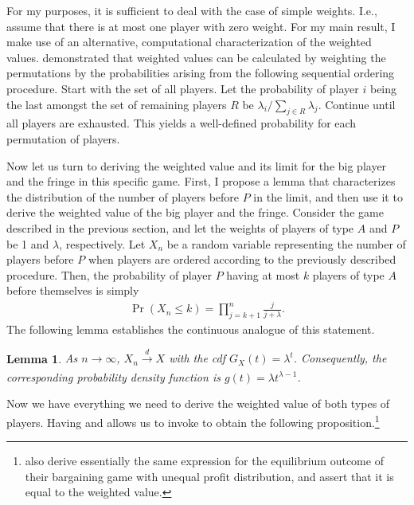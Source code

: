 \documentclass[a4paper]{article}
\newtheorem{lemma}{Lemma}
\begin{document}
For my purposes, it is sufficient to deal with the case of simple weights.
I.e., assume that there is at most one player with zero weight.
For my main result, I make use of an alternative, computational characterization of the weighted values. 
\textcite{kalai1987weighted} demonstrated that weighted values can be calculated by weighting the permutations by the probabilities arising from the following sequential ordering procedure.
Start with the set of all players.
Let the probability of player $i$ being the last amongst the set of remaining players $R$ be $\lambda_i / \sum_{j \in R} \lambda_j$.
Continue until all players are exhausted.
This yields a well-defined probability for each permutation of players.

Now let us turn to deriving the weighted value and its limit for the big player and the fringe in this specific game.
First, I propose a lemma that characterizes the distribution of the number of players before $P$ in the limit, and then use it to derive the weighted value of the big player and the fringe.
Consider the game described in the previous section, and let the weights of players of type $A$ and $P$ be 1 and $\lambda$, respectively.
Let $X_n$ be a random variable representing the number of players before $P$ when players are ordered according to the previously described procedure.
Then, the probability of player $P$ having at most $k$ players of type $A$ before themselves is simply
\begin{align}
    \label{eq:entry_distr_discrete}
    \Pr(X_n \leq k) = \prod_{j=k+1}^n \frac{j}{j + \lambda}.
\end{align}
The following lemma establishes the continuous analogue of this statement.
\begin{lemma}
    \label{lem:entry_distr}
    As $n \to \infty$, $X_n \xrightarrow[]{d} X$ with the cdf $G_X(t) = \lambda^t$.
    Consequently, the corresponding probability density function is $g(t) = \lambda t^{\lambda - 1}$.
\end{lemma}

Now we have everything we need to derive the weighted value of both types of players.
Having  and  allows us to invoke  to obtain the following proposition.\footnote{
    \textcite{stole1996intra} also derive essentially the same expression for the equilibrium outcome of their bargaining game with unequal profit distribution, and assert that it is equal to the weighted value.
}
\end{document}
